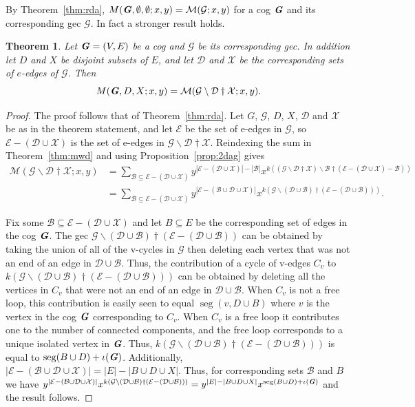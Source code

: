\documentclass{amsart}
\newcommand{\gec}[1]{\mathcal{#1}}
\newcommand{\calM}{\mathcal{M}}
\newcommand{\cog}[1]{\textbf{\textit #1}}
\newcommand{\ba}{\mathbin{\backslash}}
\newcommand{\ext}{\mathbin{\dagger}}
\DeclareMathOperator{\seg}{seg}
\newtheorem{theorem}{Theorem}[section]
\theoremstyle{definition}
\theoremstyle{remark}
\numberwithin{equation}{section}
\begin{document}
By  Theorem~\ref{thm:rda}, $M(\cog{G},\emptyset,\emptyset;x, y) = \calM(\gec{G} ; x,y)$
 for  a cog $\cog{G}$ and its corresponding gec $\gec{G}$. In fact a stronger result holds. 


\begin{theorem}\label{thm:scg}
Let $\cog{G}=(V,E)$ be a cog and $\gec{G}$ be its corresponding gec. In addition let $D$ and $X$ be disjoint subsets of $E$, and let $\gec{D}$ and $\gec{X}$ be the corresponding sets of $e$-edges of $\gec{G}$.  Then
\[ M(\cog{G},D,X;x, y) =  \calM(\gec{G}\ba \gec{D}\ext \gec{X}  ; x,y).\]
\end{theorem}
\begin{proof}
The proof follows that of Theorem~\ref{thm:rda}.
Let $G$, $\gec{G}$,  $D$, $X$, $\gec{D}$ and $\gec{X}$ be as in the theorem statement, and let $\mathcal{E}$ be the set of e-edges in $\gec{G}$, so $\mathcal{E}-(\gec{D}\cup \gec{X})$ is the set of e-edges in $\gec{G}\ba \gec{D}\ext \gec{X}$. 
Reindexing the sum in Theorem~\ref{thm:mwd} and using Proposition~\ref{prop:2dag} gives  
\begin{align*}
\calM(\gec{G}\ba \gec{D}\ext \gec{X};x,y) 
&= \sum_{\mathcal{B} \subseteq \mathcal{E}-(\gec{D}\cup \gec{X})} y^{|\mathcal{E}-(\gec{D}\cup \gec{X})|-|\mathcal{B}|}x^{k((\gec{G}\ba \gec{D}\ext \gec{X})\ba \mathcal{B} \ext (\mathcal{E}-(\gec{D}\cup \gec{X})-\mathcal{B}))}
\\
&=
\sum_{\mathcal{B} \subseteq \mathcal{E}-(\gec{D}\cup \gec{X})} 
y^{|\mathcal{E}-(\mathcal{B}\cup \gec{D}\cup \gec{X})|}
x^{k(\gec{G}\ba (\gec{D}\cup \gec{B}) \ext (\gec{E}-(\gec{D}\cup \gec{B})))}
.
\end{align*}

Fix some $\mathcal{B} \subseteq \mathcal{E}-(\gec{D}\cup \gec{X})$ and let $B\subseteq E$ be the corresponding set of edges in the cog $\cog{G}$. 
The gec
$\gec{G}\ba (\gec{D}\cup\mathcal{B}) \ext (\mathcal{E}-(\gec{D}\cup\mathcal{B}))$ can be obtained by taking the union of all of the v-cycles in $\gec{G}$ then deleting each vertex that was not an end of an edge in $\gec{D}\cup\mathcal{B}$. 
Thus, the contribution of a cycle of v-edges $C_v$ to $k(\gec{G}\ba (\gec{D}\cup\mathcal{B}) \ext (\mathcal{E}-(\gec{D}\cup\mathcal{B})))$ can be obtained by deleting all the vertices in $C_v$ that were not an end of an edge in $\gec{D}\cup\mathcal{B}$. When $C_v$ is not a free loop, this contribution is easily seen to equal $\seg(v,D\cup B)$ where $v$ is the vertex in the cog $\cog{G}$ corresponding to $C_v$. 
When $C_v$ is a free loop it contributes one to the number of connected components, and the free loop corresponds to a unique isolated vertex in
$\cog{G}$.
Thus, 
$k(\gec{G}\ba (\gec{D}\cup\mathcal{B}) \ext (\mathcal{E}-(\gec{D}\cup\mathcal{B})))$ 
is equal to 
$\seg(B\cup D)+\iota(\cog{G})$. 
Additionally,  $|\mathcal{E}-(\mathcal{B}\cup \gec{D}\cup \gec{X})| = |E|-|B\cup D\cup X|$.
Thus, for corresponding sets $\gec{B}$ and $B$ we have  
$y^{|\mathcal{E}-(\mathcal{B}\cup \gec{D}\cup \gec{X})|}
x^{k(\gec{G}\ba (\gec{D}\cup \gec{B}) \ext (\gec{E}-(\gec{D}\cup \gec{B})))}
=
 y^{|E|-|B\cup D\cup X|} x^{\seg(B\cup D)+\iota(\cog{G})}$ and
the result follows.
\end{proof}
\end{document}
